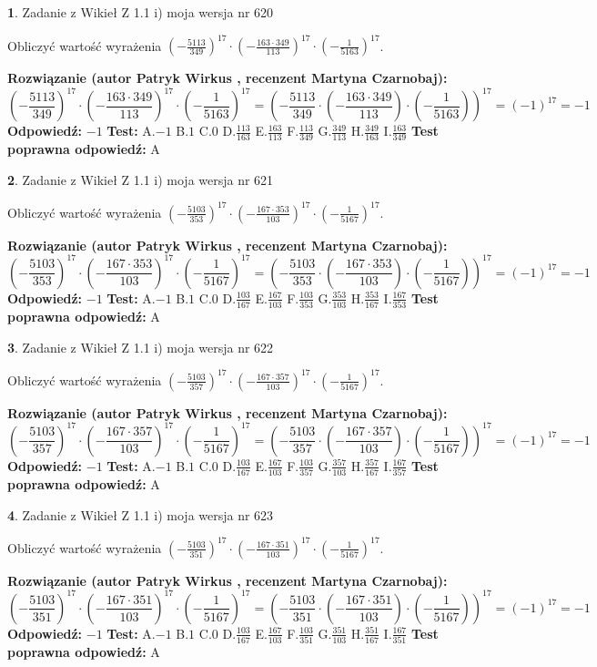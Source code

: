 \documentclass[12pt, a4paper]{article}
\theoremstyle{definition} %
\newtheorem{zad}{}
\newcommand{\zadStart}[1]{\begin{zad}#1\newline}
\newcommand{\zadStop}{\end{zad}}
\newcommand{\rozwStart}[2]{\noindent \textbf{Rozwiązanie (autor #1 , recenzent #2): }\newline}
\newcommand{\rozwStop}{\newline}
\newcommand{\odpStart}{\noindent \textbf{Odpowiedź:}\newline}
\newcommand{\odpStop}{\newline}
\newcommand{\testStart}{\noindent \textbf{Test:}\newline}
\newcommand{\testStop}{\newline}
\newcommand{\kluczStart}{\noindent \textbf{Test poprawna odpowiedź:}\newline}
\newcommand{\kluczStop}{\newline}
\begin{document}
\zadStart{Zadanie z Wikieł Z 1.1 i) moja wersja nr 620}

Obliczyć wartość wyrażenia $(-\frac{5113}{349})^{17} \cdot (-\frac{163 \cdot 349}{113})^{17} \cdot (-\frac{1}{5163})^{17}$.
\zadStop
\rozwStart{Patryk Wirkus}{Martyna Czarnobaj}
$$(-\frac{5113}{349})^{17} \cdot (-\frac{163 \cdot 349}{113})^{17} \cdot (-\frac{1}{5163})^{17} = (-\frac{5113}{349} \cdot (-\frac{163 \cdot 349}{113}) \cdot (-\frac{1}{5163}))^{17} = (-1)^{17} = -1$$
\rozwStop
\odpStart
$-1$
\odpStop
\testStart
A.$-1$ B.$1$ C.$0$ D.$\frac{113}{163}$ E.$\frac{163}{113}$
F.$\frac{113}{349}$ G.$\frac{349}{113}$
H.$\frac{349}{163}$
I.$\frac{163}{349}$
\testStop
\kluczStart
A
\kluczStop



\zadStart{Zadanie z Wikieł Z 1.1 i) moja wersja nr 621}

Obliczyć wartość wyrażenia $(-\frac{5103}{353})^{17} \cdot (-\frac{167 \cdot 353}{103})^{17} \cdot (-\frac{1}{5167})^{17}$.
\zadStop
\rozwStart{Patryk Wirkus}{Martyna Czarnobaj}
$$(-\frac{5103}{353})^{17} \cdot (-\frac{167 \cdot 353}{103})^{17} \cdot (-\frac{1}{5167})^{17} = (-\frac{5103}{353} \cdot (-\frac{167 \cdot 353}{103}) \cdot (-\frac{1}{5167}))^{17} = (-1)^{17} = -1$$
\rozwStop
\odpStart
$-1$
\odpStop
\testStart
A.$-1$ B.$1$ C.$0$ D.$\frac{103}{167}$ E.$\frac{167}{103}$
F.$\frac{103}{353}$ G.$\frac{353}{103}$
H.$\frac{353}{167}$
I.$\frac{167}{353}$
\testStop
\kluczStart
A
\kluczStop



\zadStart{Zadanie z Wikieł Z 1.1 i) moja wersja nr 622}

Obliczyć wartość wyrażenia $(-\frac{5103}{357})^{17} \cdot (-\frac{167 \cdot 357}{103})^{17} \cdot (-\frac{1}{5167})^{17}$.
\zadStop
\rozwStart{Patryk Wirkus}{Martyna Czarnobaj}
$$(-\frac{5103}{357})^{17} \cdot (-\frac{167 \cdot 357}{103})^{17} \cdot (-\frac{1}{5167})^{17} = (-\frac{5103}{357} \cdot (-\frac{167 \cdot 357}{103}) \cdot (-\frac{1}{5167}))^{17} = (-1)^{17} = -1$$
\rozwStop
\odpStart
$-1$
\odpStop
\testStart
A.$-1$ B.$1$ C.$0$ D.$\frac{103}{167}$ E.$\frac{167}{103}$
F.$\frac{103}{357}$ G.$\frac{357}{103}$
H.$\frac{357}{167}$
I.$\frac{167}{357}$
\testStop
\kluczStart
A
\kluczStop



\zadStart{Zadanie z Wikieł Z 1.1 i) moja wersja nr 623}

Obliczyć wartość wyrażenia $(-\frac{5103}{351})^{17} \cdot (-\frac{167 \cdot 351}{103})^{17} \cdot (-\frac{1}{5167})^{17}$.
\zadStop
\rozwStart{Patryk Wirkus}{Martyna Czarnobaj}
$$(-\frac{5103}{351})^{17} \cdot (-\frac{167 \cdot 351}{103})^{17} \cdot (-\frac{1}{5167})^{17} = (-\frac{5103}{351} \cdot (-\frac{167 \cdot 351}{103}) \cdot (-\frac{1}{5167}))^{17} = (-1)^{17} = -1$$
\rozwStop
\odpStart
$-1$
\odpStop
\testStart
A.$-1$ B.$1$ C.$0$ D.$\frac{103}{167}$ E.$\frac{167}{103}$
F.$\frac{103}{351}$ G.$\frac{351}{103}$
H.$\frac{351}{167}$
I.$\frac{167}{351}$
\testStop
\kluczStart
A
\kluczStop
\end{document}
